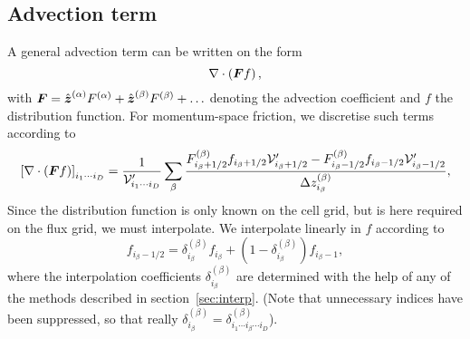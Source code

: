 \documentclass{notes}
\newcommand{\Vp}{\mathcal{V}'}
\begin{document}
    \subsection{Advection term}\label{sec:advection}
    A general advection term can be written on the form
    \begin{equation*}
        \nabla\cdot\left( \boldsymbol{F} f \right),
    \end{equation*}
    with $\boldsymbol{F} = \hat{\boldsymbol{z}}^{(\alpha)}F^{(\alpha)} + \hat{\boldsymbol{z}}^{(\beta)}F^{(\beta)}+\ldots$
    denoting the advection coefficient and $f$ the distribution function. For
    momentum-space friction, we discretise such terms according to
    \begin{equation}\label{eq:advection:discr}
        \left[\nabla\cdot\left( \bb{F}f \right) \right]_{i_1\cdots i_D} =
            \frac{1}{\Vp_{i_1\cdots i_D}}\sum_\beta \frac{
                F^{(\beta)}_{i_\beta+1/2}f_{i_\beta+1/2} \Vp_{i_\beta+1/2} -
                F^{(\beta)}_{i_\beta-1/2}f_{i_\beta-1/2} \Vp_{i_\beta-1/2}
            }{\Delta z^{(\beta)}_{i_\beta}},
    \end{equation}
    Since the distribution function is only known on the cell grid, but is here
    required on the flux grid, we must interpolate. We interpolate linearly in
    $f$ according to
    \begin{equation}
        f_{i_\beta-1/2} = \delta^{(\beta)}_{i_\beta} f_{i_\beta} + \left( 1 - \delta^{(\beta)}_{i_\beta} \right) f_{i_\beta-1},
    \end{equation}
    where the interpolation coefficients $\delta^{(\beta)}_{i_\beta}$ are
    determined with the help of any of the methods described in
    section~\ref{sec:interp}. (Note that unnecessary indices have been
    suppressed, so that really
    $\delta^{(\beta)}_{i_\beta} = \delta^{(\beta)}_{i_1\cdots i_\beta\cdots i_D}$).
\end{document}
